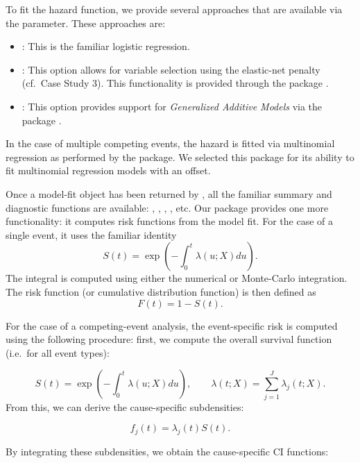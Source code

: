 To fit the hazard function, we provide several approaches that are
available via the  parameter. These approaches are:

\begin{itemize}
\tightlist
\item
  : This is the familiar logistic regression.
\item
  : This option allows for variable selection using the
  elastic-net \citep{zou2005regularization} penalty (cf.~Case Study 3).
  This functionality is provided through the  package
  \citep{friedman2010jss}.
\item
  : This option provides support for \emph{Generalized
  Additive Models} via the  package
  \citep{hastie1987generalized}.
\end{itemize}

In the case of multiple competing events, the hazard is fitted via
multinomial regression as performed by the  package. We
selected this package for its ability to fit multinomial regression
models with an offset.

Once a model-fit object has been returned by , all
the familiar summary and diagnostic functions are available:
, , , , etc. Our
package provides one more functionality: it computes risk functions from
the model fit. For the case of a single event, it uses the familiar
identity \begin{equation}\label{eqn:surv}
S(t) = \exp\left(-\int_0^t \lambda(u;X) du\right).
\end{equation} The integral is computed using either the numerical or
Monte-Carlo integration. The risk function (or cumulative distribution
function) is then defined as \begin{equation}\label{eqn:CDF}
F(t) = 1 - S(t).
\end{equation}

For the case of a competing-event analysis, the event-specific risk is
computed using the following procedure: first, we compute the overall
survival function (i.e.~for all event types):

\[ S(t) = \exp\left(-\int_0^t \lambda(u;X) du\right),\qquad \lambda(t;X) = \sum_{j=1}^J \lambda_j(t;X).\]
From this, we can derive the cause-specific subdensities:

\[ f_j(t) = \lambda_j(t)S(t).\]

By integrating these subdensities, we obtain the cause-specific CI
functions:

